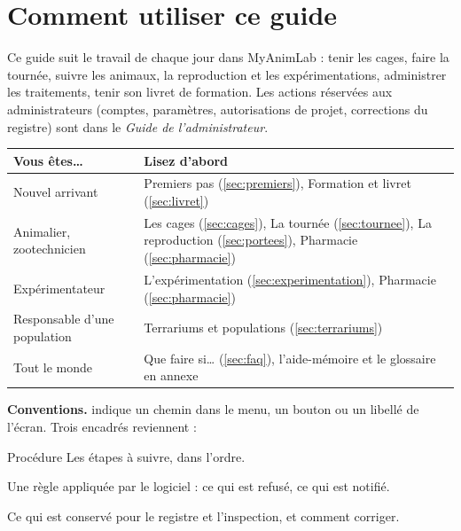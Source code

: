 \documentclass[11pt,a4paper]{article}
\begin{document}


\section*{Comment utiliser ce guide}
Ce guide suit le travail de chaque jour dans MyAnimLab : tenir les cages,
faire la tournée, suivre les animaux, la reproduction et les expérimentations,
administrer les traitements, tenir son livret de formation. Les actions
réservées aux administrateurs (comptes, paramètres, autorisations de projet,
corrections du registre) sont dans le \emph{Guide de l'administrateur}.

\begin{center}
\begin{tabularx}{\textwidth}{@{}lX@{}}
\toprule
\textbf{Vous êtes…} & \textbf{Lisez d'abord}\\
\midrule
Nouvel arrivant & Premiers pas (\ref{sec:premiers}), Formation et livret (\ref{sec:livret})\\
Animalier, zootechnicien & Les cages (\ref{sec:cages}), La tournée (\ref{sec:tournee}), La reproduction (\ref{sec:portees}), Pharmacie (\ref{sec:pharmacie})\\
Expérimentateur & L'expérimentation (\ref{sec:experimentation}), Pharmacie (\ref{sec:pharmacie})\\
Responsable d'une population & Terrariums et populations (\ref{sec:terrariums})\\
Tout le monde & Que faire si… (\ref{sec:faq}), l'aide-mémoire et le glossaire en annexe\\
\bottomrule
\end{tabularx}
\end{center}

\noindent\textbf{Conventions.}  indique un
chemin dans le menu,  un bouton ou un libellé de l'écran.
Trois encadrés reviennent :
\begin{procedure}{Procédure}
Les étapes à suivre, dans l'ordre.
\end{procedure}
\begin{regle}
Une règle appliquée par le logiciel : ce qui est refusé, ce qui est notifié.
\end{regle}
\begin{trace}
Ce qui est conservé pour le registre et l'inspection, et comment corriger.
\end{trace}
\end{document}
